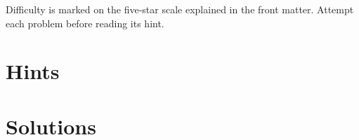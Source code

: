 \noindent Difficulty is marked on the five-star scale explained in the
front matter. Attempt each problem before reading its hint.



\section{Hints}
\label{sec:hints-1}



\ifstudent\else
\section{Solutions}
\label{sec:solutions-1}

\fi


